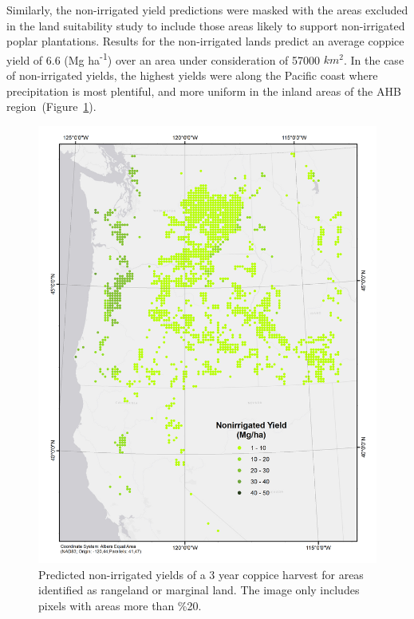\documentclass[preprint,review,12pt]{elsarticle}
\begin{document}
Similarly, the non-irrigated yield predictions were masked with the
areas excluded in the land suitability study to include those areas
likely to support non-irrigated poplar plantations.  Results for the
non-irrigated lands predict an average coppice yield of 6.6 (Mg ha\textsuperscript{-1})
over an area under consideration of 57000 $km^2$.  In the case of
non-irrigated yields, the highest yields were along the Pacific coast
where precipitation is most plentiful, and more uniform in the inland
areas of the \ac{AHB} region~(Figure~\ref{fig:nonirrigated_yield}).

\begin{figure}[hp]
  \centering
  \includegraphics[width=1.0\linewidth]{nonirrigated_yield}
  \caption{Predicted non-irrigated yields of a 3 year coppice
    harvest for areas identified as rangeland or marginal land.  The
    image only includes pixels with areas more than \%20.}
  \label{fig:nonirrigated_yield}
\end{figure}
\end{document}
